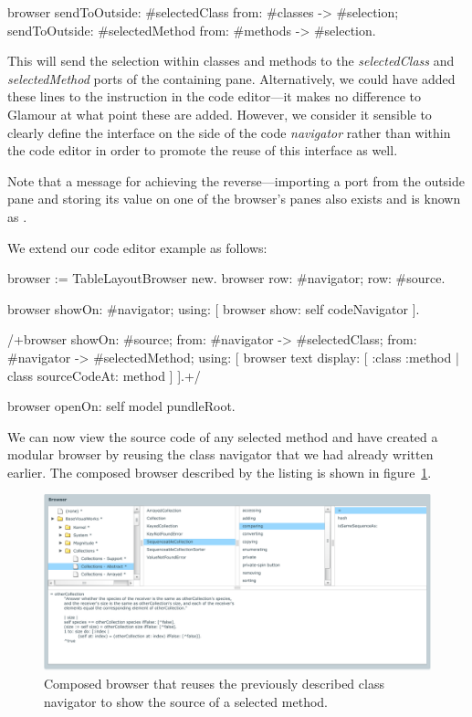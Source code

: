 \documentclass[a4paper,10pt,twoside]{book}
\begin{document}
\begin{code}{}
browser
	sendToOutside: #selectedClass from: #classes -> #selection;
	sendToOutside: #selectedMethod from: #methods -> #selection.
\end{code}

This will send the selection within classes and methods to the \emph{selectedClass} and \emph{selectedMethod} ports of the containing pane. Alternatively, we could have added these lines to the  instruction in the code editor---it makes no difference to Glamour at what point these are added. However, we consider it sensible to clearly define the interface on the side of the code \emph{navigator} rather than within the code editor in order to promote the reuse of this interface as well.

Note that a message for achieving the reverse---importing a port from the outside pane and storing its value on one of the browser’s panes also exists and is known as .

We extend our code editor example as follows:

\begin{code}{}
browser := TableLayoutBrowser new.
browser
	row: #navigator;
	row: #source.

browser showOn: #navigator; using: [
	browser show: self codeNavigator
].

/+browser
	showOn: #source;
	from: #navigator -> #selectedClass;
	from: #navigator -> #selectedMethod; using: [
	browser text
		display: [ :class :method | class sourceCodeAt: method ]
].+/

browser openOn: self model pundleRoot.
\end{code}

We can now view the source code of any selected method and have created a modular browser by reusing the class navigator that we had already written earlier. The composed browser described by the listing is shown in figure~\ref{fig:composed-browser}.

\begin{figure}[htbp]
\centerline{\includegraphics[width=\linewidth]{classbrowser.pdf}}
\caption{Composed browser that reuses the previously described class navigator to show the source of a selected method.}
\label{fig:composed-browser}
\end{figure}
\end{document}
